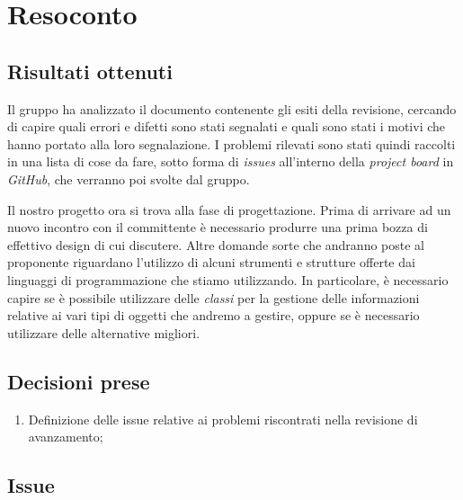 \section{Resoconto}

\subsection{Risultati ottenuti}
Il gruppo ha analizzato il documento contenente gli esiti della revisione, cercando di capire quali errori e difetti sono stati segnalati e quali sono stati i motivi che hanno portato alla loro segnalazione. I problemi rilevati sono stati quindi raccolti in una lista di cose da fare, sotto forma di \textit{issues} all'interno della \textit{project board} in \textit{GitHub}, che verranno poi svolte dal gruppo.

Il nostro progetto ora si trova alla fase di progettazione. Prima di arrivare ad un nuovo incontro con il committente è necessario produrre una prima bozza di effettivo design di cui discutere. Altre domande sorte che andranno poste al proponente riguardano l'utilizzo di alcuni strumenti e strutture offerte dai linguaggi di programmazione che stiamo utilizzando. In particolare, è necessario capire se è possibile utilizzare delle \textit{classi} per la gestione delle informazioni relative ai vari tipi di oggetti che andremo a gestire, oppure se è necessario utilizzare delle alternative migliori.

\subsection{Decisioni prese}

\begin{enumerate}
    \item Definizione delle issue relative ai problemi riscontrati nella revisione di avanzamento;
\end{enumerate}

\subsection{Issue}

